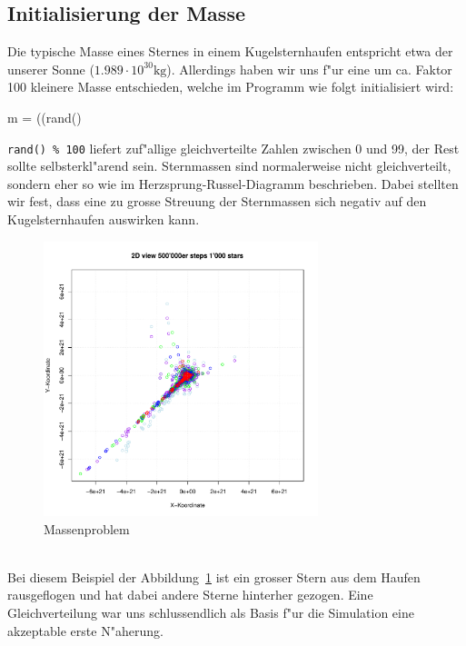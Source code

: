 \begin{refsection}
	\subsection{Initialisierung der Masse \label{kugel:subsection:InitMasse}}
	Die typische Masse eines Sternes in einem Kugelsternhaufen entspricht etwa der unserer Sonne ($\mathrm{1.989 \cdot 10^{30} kg}$). Allerdings haben wir uns f"ur eine um ca. Faktor 100 kleinere Masse entschieden, welche im Programm wie folgt initialisiert wird:
\begin{Cpp}
m = ((rand()%
\end{Cpp}
 	\texttt{rand()  \% 100} liefert zuf"allige gleichverteilte Zahlen zwischen 0 und 99, der Rest sollte selbsterkl"arend sein. Sternmassen sind normalerweise nicht gleichverteilt, sondern eher so wie im Herzsprung-Russel-Diagramm beschrieben. Dabei stellten wir fest, dass eine zu grosse Streuung der Sternmassen sich negativ auf den Kugelsternhaufen auswirken kann.\\
	\begin{figure}[h!]
		\begin{center}
			\includegraphics[width = 8cm]{kugel/images/lolli.pdf}
		\end{center}
		\caption{Massenproblem
		\label{Kugel.Massenproblem}}
	\end{figure}\\
	Bei diesem Beispiel der Abbildung~\ref{Kugel.Massenproblem} ist ein grosser Stern aus dem Haufen rausgeflogen und hat dabei andere Sterne hinterher gezogen. Eine Gleichverteilung war uns schlussendlich als Basis f"ur die Simulation eine akzeptable erste N"aherung.
	

\end{refsection}
